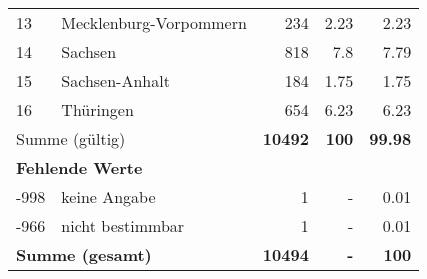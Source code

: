 \begin{longtable}{lXrrr}
     13 &
     \multicolumn{1}{X}{ Mecklenburg-Vorpommern   } &


       \num{234} &
       \num[round-mode=places,round-precision=2]{2,23} &
         \num[round-mode=places,round-precision=2]{2,23} \\

     14 &
     \multicolumn{1}{X}{ Sachsen   } &


       \num{818} &
       \num[round-mode=places,round-precision=2]{7,8} &
         \num[round-mode=places,round-precision=2]{7,79} \\

     15 &
     \multicolumn{1}{X}{ Sachsen-Anhalt   } &


       \num{184} &
       \num[round-mode=places,round-precision=2]{1,75} &
         \num[round-mode=places,round-precision=2]{1,75} \\

     16 &
     \multicolumn{1}{X}{ Thüringen   } &


       \num{654} &
       \num[round-mode=places,round-precision=2]{6,23} &
         \num[round-mode=places,round-precision=2]{6,23} \\
     \midrule
     \multicolumn{2}{l}{Summe (gültig)} &
       \textbf{\num{10492}} &
     \textbf{100} &
       \textbf{\num[round-mode=places,round-precision=2]{99,98}} \\
     \multicolumn{5}{l}{\textbf{Fehlende Werte}}\\
       -998 &
       keine Angabe &
         \num{1} &
        - &
         \num[round-mode=places,round-precision=2]{0,01} \\
       -966 &
       nicht bestimmbar &
         \num{1} &
        - &
         \num[round-mode=places,round-precision=2]{0,01} \\
     \midrule
     \multicolumn{2}{l}{\textbf{Summe (gesamt)}} &
          \textbf{\num{10494}} &
        \textbf{-} &
        \textbf{100} \\
     \bottomrule
     \end{longtable}
     
